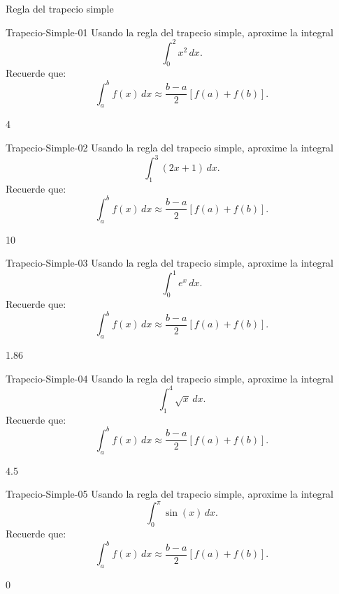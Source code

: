 \documentclass[a4,11pt]{aleph-notas}
\begin{document}
\begin{quiz}{Regla del trapecio simple}
\begin{numerical}[tolerance=0.01]%
    {Trapecio-Simple-01}
    Usando la regla del trapecio simple, aproxime la integral
    \[
        \int_{0}^{2} x^2\,dx.
    \]
    Recuerde que:
    \[
        \int_a^b f(x)\,dx \approx \frac{b-a}{2}\left[f(a)+f(b)\right].
    \]
    \item 4
\end{numerical}

\begin{numerical}[tolerance=0.01]%
    {Trapecio-Simple-02}
    Usando la regla del trapecio simple, aproxime la integral
    \[
        \int_{1}^{3} (2x+1)\,dx.
    \]
    Recuerde que:
    \[
        \int_a^b f(x)\,dx \approx \frac{b-a}{2}\left[f(a)+f(b)\right].
    \]
    \item 10
\end{numerical}

\begin{numerical}[tolerance=0.01]%
    {Trapecio-Simple-03}
    Usando la regla del trapecio simple, aproxime la integral
    \[
        \int_{0}^{1} e^x\,dx.
    \]
    Recuerde que:
    \[
        \int_a^b f(x)\,dx \approx \frac{b-a}{2}\left[f(a)+f(b)\right].
    \]
    \item 1.86
\end{numerical}

\begin{numerical}[tolerance=0.01]%
    {Trapecio-Simple-04}
    Usando la regla del trapecio simple, aproxime la integral
    \[
        \int_{1}^{4} \sqrt{x}\,dx.
    \]
    Recuerde que:
    \[
        \int_a^b f(x)\,dx \approx \frac{b-a}{2}\left[f(a)+f(b)\right].
    \]
    \item 4.5
\end{numerical}

\begin{numerical}[tolerance=0.01]%
    {Trapecio-Simple-05}
    Usando la regla del trapecio simple, aproxime la integral
    \[
        \int_{0}^{\pi} \sin(x)\,dx.
    \]
    Recuerde que:
    \[
        \int_a^b f(x)\,dx \approx \frac{b-a}{2}\left[f(a)+f(b)\right].
    \]
    \item 0
\end{numerical}

\end{quiz}
\end{document}
